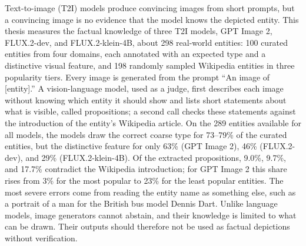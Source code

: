 Text-to-image (T2I) models produce convincing images from short prompts, but a
convincing image is no evidence that the model knows the depicted entity. This
thesis measures the factual knowledge of three T2I models, GPT Image 2,
FLUX.2-dev, and FLUX.2-klein-4B, about 298 real-world entities: 100 curated
entities from four domains, each annotated with an expected type and a
distinctive visual feature, and 198 randomly sampled Wikipedia entities in three
popularity tiers. Every image is generated from the prompt ``An image of
[entity].'' A vision-language model, used as a judge, first describes each image without
knowing which entity it should show and lists short statements about what is
visible, called propositions; a second call checks these statements against the
introduction of the entity's Wikipedia article. On the 289 entities
available for all models, the models draw the correct coarse type for 73--79\%
of the curated entities, but the distinctive feature for only 63\% (GPT
Image 2), 46\% (FLUX.2-dev), and 29\% (FLUX.2-klein-4B). Of the extracted
propositions, 9.0\%, 9.7\%, and 17.7\% contradict the Wikipedia introduction; for GPT
Image 2 this share rises from 3\% for the most popular to 23\% for the least
popular entities. The most severe errors come from reading the entity name as
something else, such as a portrait of a man for the British bus model Dennis
Dart. Unlike language models, image generators cannot abstain, and their
knowledge is limited to what can be drawn. Their outputs should therefore not
be used as factual depictions without verification.